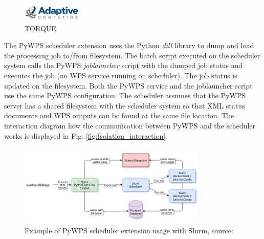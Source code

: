\begin{figure}[h!]
\centering
\begin{floatrow}
\end{floatrow}
\end{figure}

\begin{figure}[h!]
\centering
\includegraphics[width=0.25\textwidth]{img/Isolation_torque.png}
\caption{TORQUE}
\label{fig:Isolation_torque}
\end{figure}
\bigskip

The PyWPS scheduler extension uses the Python \textit{dill} library to dump and load the processing job to/from filesystem. The batch script executed on the scheduler system calls the PyWPS \textit{joblauncher} script with the dumped job status and executes the job (no WPS service running on scheduler). The job status is updated on the filesystem. Both the PyWPS service and the joblauncher script use the same PyWPS configuration. The scheduler assumes that the PyWPS server has a shared filesystem with the scheduler system so that XML status documents and WPS outputs can be found at the same file location. The interaction diagram how the communication between PyWPS and the scheduler works is displayed in Fig. \ref{fig:Isolation_interaction}.

\bigskip
\begin{figure}[h!]
\centering
\includegraphics[width=0.8\textwidth]{img/Isolation_slurm_usage.png}
\caption{Example of PyWPS scheduler extension usage with Slurm, source: \cite{PyWPS_docs}}
\label{fig:Isolation_slurm_usage}
\end{figure}

